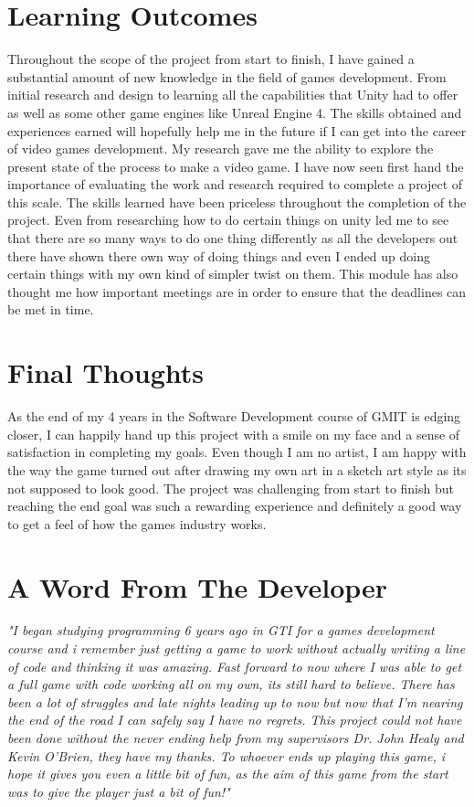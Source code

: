 \section{Learning Outcomes}
Throughout the scope of the project from start to finish, I have gained a substantial amount of new knowledge in the field of games development. From initial research and design to learning all the capabilities that Unity had to offer as well as some other game engines like Unreal Engine 4. The skills obtained and experiences earned will hopefully help me in the future if I can get into the career of video games development. My research gave me the ability to explore the present state of the process to make a video game. I have now seen first hand the importance of evaluating the work and research required to complete a project of this scale.
\newline
The skills learned have been priceless throughout the completion of the project. Even from researching how to do certain things on unity led me to see that there are so many ways to do one thing differently as all the developers out there have shown there own way of doing things and even I ended up doing certain things with my own kind of simpler twist on them. This module has also thought me how important meetings are in order to ensure that the deadlines can be met in time.

\section{Final Thoughts}
As the end of my 4 years in the Software Development course of GMIT is edging closer, I can happily hand up this project with a smile on my face and a sense of satisfaction in completing my goals. Even though I am no artist, I am happy with the way the game turned out after drawing my own art in a sketch art style as its not supposed to look good. The project was challenging from start to finish but reaching the end goal was such a rewarding experience and definitely a good way to get a feel of how the games industry works.

\section{A Word From The Developer}
 \textit{"I began studying programming 6 years ago in GTI for a games development course and i remember just getting a game to work without actually writing a line of code and thinking it was amazing. Fast forward to now where I was able to get a full game with code working all on my own, its still hard to believe. There has been a lot of struggles and late nights leading up to now but now that I'm nearing the end of the road I can safely say I have no regrets. This project could not have been done without the never ending help from my supervisors Dr. John Healy and Kevin O'Brien, they have my thanks. To whoever ends up playing this game, i hope it gives you even a little bit of fun, as the aim of this game from the start was to give the player just a bit of fun!"}